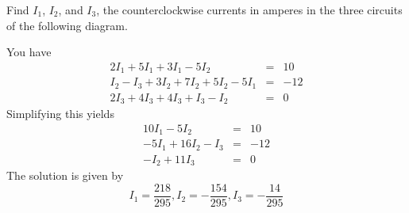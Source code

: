 \begin{ex} Find $I_{1}$, $I_{2}$, and $I_{3}$, the counterclockwise currents in
  amperes in the three circuits of the following diagram.

  \begin{center}
  \end{center}

  \begin{sol}
    You
    have
    \begin{eqnarray*}
      2I_{1}+5I_{1}+3I_{1}-5I_{2} &=& 10 \\
      I_{2}- I_{3} +3I_{2}+7I_{2}+5I_{2}-5I_{1}  &=&-12 \\
      2I_{3}+4I_{3}+4I_{3}+I_{3}-I_{2} &=& 0
    \end{eqnarray*}
    Simplifying this yields
    \begin{eqnarray*}
      10I_{1}-5I_{2} &=& 10 \\
      -5I_{1} + 16I_{2}- I_{3} &=&-12 \\
      -I_{2} + 11I_{3} &=&0
    \end{eqnarray*}
    The solution is given by
    \begin{equation*}
      I_{1}=\frac{218}{295},I_{2}=-\frac{154}{295},I_{3}=-\frac{14}{295}
    \end{equation*}

  \end{sol}
\end{ex}

